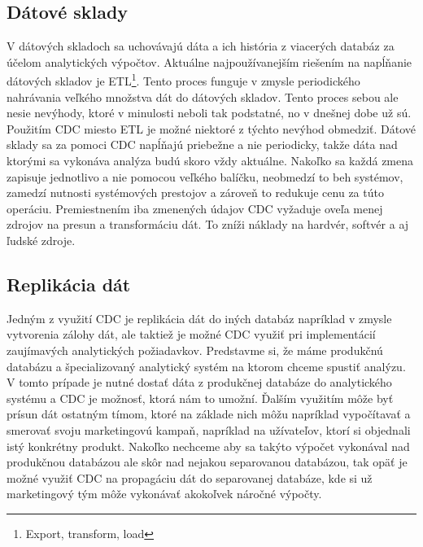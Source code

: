 \subsection{Dátové sklady}
V dátových skladoch sa uchovávajú dáta a ich história z viacerých databáz za účelom analytických výpočtov. Aktuálne najpoužívanejším riešením na napĺňanie dátových skladov je ETL\footnote{Export, transform, load}. Tento proces funguje v zmysle periodického nahrávania veľkého množstva dát do dátových skladov. Tento proces sebou ale nesie nevýhody, ktoré v minulosti neboli tak podstatné, no v dnešnej dobe už sú. Použitím CDC miesto ETL je možné niektoré z týchto nevýhod obmedziť. Dátové sklady sa za pomoci CDC napĺňajú priebežne a nie periodicky, takže dáta nad ktorými sa vykonáva analýza budú skoro vždy aktuálne. Nakoľko sa každá zmena zapisuje jednotlivo a nie pomocou veľkého balíčku, neobmedzí to beh systémov, zamedzí nutnosti systémových prestojov a zároveň to redukuje cenu za túto operáciu. Premiestnením iba zmenených údajov CDC vyžaduje oveľa menej zdrojov na presun a transformáciu dát. To zníži náklady na hardvér, softvér a aj ľudské zdroje. \cite{attunity:etl_cdc}

\subsection{Replikácia dát}
Jedným z využití CDC je replikácia dát do iných databáz napríklad v zmysle vytvorenia zálohy dát, ale taktiež je možné CDC využiť pri implementácií zaujímavých analytických požiadavkov. Predstavme si, že máme produkčnú databázu a špecializovaný analytický systém na ktorom chceme spustiť analýzu. V tomto prípade je nutné dostať dáta z produkčnej databáze do analytického systému a CDC je možnosť, ktorá nám to umožní. Ďalším využitím môže byť prísun dát ostatným tímom, ktoré na základe nich môžu napríklad vypočítavať a smerovať svoju marketingovú kampaň, napríklad na užívateľov, ktorí si objednali istý konkrétny produkt. Nakoľko nechceme aby sa takýto výpočet vykonával nad produkčnou databázou ale skôr nad nejakou separovanou databázou, tak opäť je možné využiť CDC na propagáciu dát do separovanej databáze, kde si už marketingový tým môže vykonávať akokoľvek náročné výpočty.

